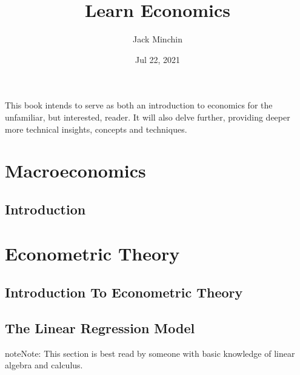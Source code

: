 \documentclass[letterpaper,10pt,english]{jupyterBook}
\title{Learn Economics}
\date{Jul 22, 2021}
\author{Jack Minchin}
\begin{document}
\pagestyle{empty}
\sphinxmaketitle
\pagestyle{plain}
\sphinxtableofcontents
\pagestyle{normal}
\label{\detokenize{intro::doc}}


This book intends to serve as both an introduction to economics for the unfamiliar, but interested, reader. It will also delve further, providing deeper \sphinxhyphen{} more technical \sphinxhyphen{} insights, concepts and techniques.


\part{Macroeconomics}


\chapter{Introduction}
\label{\detokenize{parts/macroeconomics/intro:introduction}}\label{\detokenize{parts/macroeconomics/intro::doc}}

\part{Econometric Theory}


\chapter{Introduction To Econometric Theory}
\label{\detokenize{parts/econometric-theory/introduction:introduction-to-econometric-theory}}\label{\detokenize{parts/econometric-theory/introduction::doc}}

\chapter{The Linear Regression Model}
\label{\detokenize{parts/econometric-theory/linearmodels:the-linear-regression-model}}\label{\detokenize{parts/econometric-theory/linearmodels::doc}}
\begin{sphinxadmonition}{note}{Note:}
This section is best read by someone with basic knowledge of linear algebra and calculus.
\end{sphinxadmonition}
\end{document}
